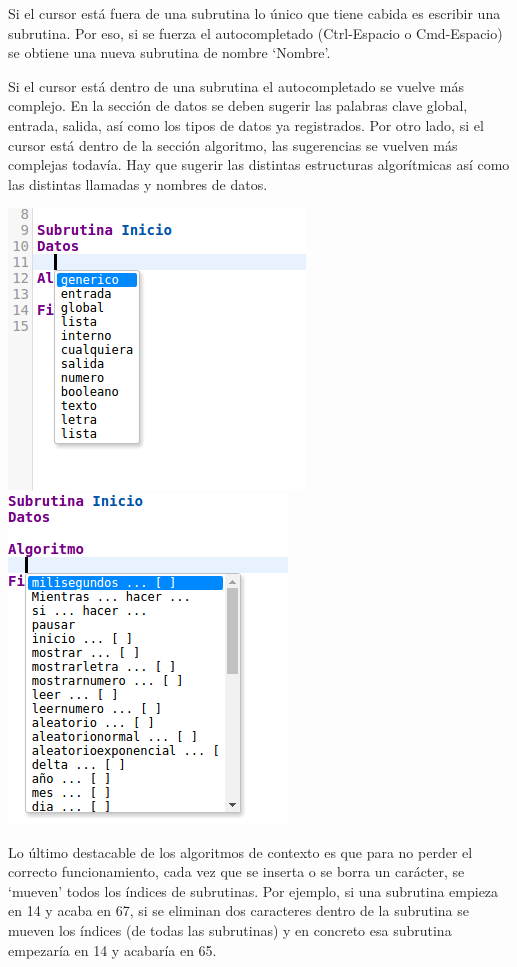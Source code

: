 \documentclass{report}
\begin{document}
	\vspace{10px}
	
	Si el cursor está fuera de una subrutina lo único que tiene cabida es escribir una subrutina. Por eso, si se fuerza el autocompletado (Ctrl-Espacio o Cmd-Espacio) se obtiene una nueva subrutina de nombre `Nombre'.
	
	\vspace{10px}
	
	Si el cursor está dentro de una subrutina el autocompletado se vuelve más complejo. En la sección de datos se deben sugerir las palabras clave global, entrada, salida, así como los tipos de datos ya registrados. Por otro lado, si el cursor está dentro de la sección algoritmo, las sugerencias se vuelven más complejas todavía. Hay que sugerir las distintas estructuras algorítmicas así como las distintas llamadas y nombres de datos.
	
	\begin{center}
	\includegraphics[width=0.45\linewidth]{autocompletado2}
	\includegraphics[width=0.35\linewidth]{autocompletado3}
	\end{center}
	
	\vspace{10px}
	
	Lo último destacable de los algoritmos de contexto es que para no perder el correcto funcionamiento, cada vez que se inserta o se borra un carácter, se `mueven' todos los índices de subrutinas. Por ejemplo, si una subrutina empieza en 14 y acaba en 67, si se eliminan dos caracteres dentro de la subrutina se mueven los índices (de todas las subrutinas) y en concreto esa subrutina empezaría en 14 y acabaría en 65.
			
\end{document}
